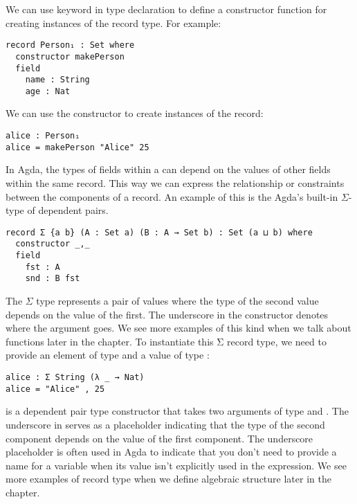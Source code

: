 We can use  keyword in  type declaration to
define a constructor function for creating instances of the record type. For
example:

\begin{verbatim}
record Person₁ : Set where
  constructor makePerson
  field
    name : String
    age : Nat
\end{verbatim}

We can use the constructor  to create instances of the 
record:

\begin{verbatim}
alice : Person₁
alice = makePerson "Alice" 25
\end{verbatim}

In Agda, the types of fields within a  can depend on the values
of other fields within the same record. This way we can express the relationship
or constraints between the components of a record. An example of this is the
Agda's built-in $\Sigma$-type of dependent pairs.

\begin{verbatim}
record Σ {a b} (A : Set a) (B : A → Set b) : Set (a ⊔ b) where
  constructor _,_
  field
    fst : A
    snd : B fst
\end{verbatim}

The $\Sigma$ type represents a pair of values where the type of the second value
depends on the value of the first. The underscore in the constructor denotes
where the argument goes. We see more examples of this kind when we talk about
functions later in the chapter. To instantiate this Σ record type, we need to
provide an element of type  and a value of type :

\begin{verbatim}
alice : Σ String (λ _ → Nat)
alice = "Alice" , 25
\end{verbatim}

 is a dependent pair type constructor that takes two arguments of type
 and . The underscore in 
serves as a placeholder indicating that the type of the second component depends
on the value of the first component. The underscore \inline{(_)} placeholder is
often used in Agda to indicate that you don't need to provide a name for a
variable when its value isn't explicitly used in the expression. We see more
examples of record type when we define algebraic structure later in the chapter. 

